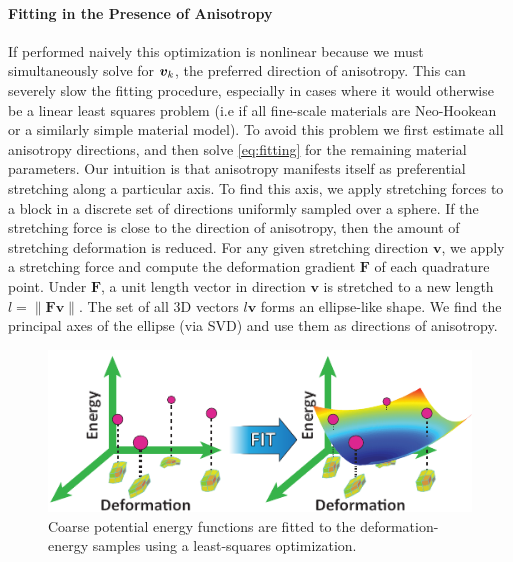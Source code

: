 \paragraph{Fitting in the Presence of Anisotropy}
If performed naively this optimization is nonlinear because we must simultaneously solve for $\bm{v}_k$, the preferred direction of anisotropy. This can severely slow the fitting procedure, especially in cases where it would otherwise be a linear least squares problem (i.e if all fine-scale materials are Neo-Hookean or a similarly simple material model).
To avoid this problem we first estimate all anisotropy directions, and then solve \autoref{eq:fitting} for the remaining material parameters.
Our intuition is that anisotropy manifests itself as preferential stretching along a particular axis. To find this axis, we apply stretching forces to a block in a discrete set of directions uniformly sampled over a sphere.
If the stretching force is close to the direction of anisotropy, then the amount of stretching deformation is reduced.
For any given stretching direction $\mathbf{v}$, we apply a stretching force and compute the deformation gradient $\mathbf{F}$ of  each quadrature point.
Under $\mathbf{F}$, a unit length vector in direction $\mathbf{v}$ is stretched to a new length $l = \|\mathbf{F}\mathbf{v}\|$.
The set of all 3D vectors $l\mathbf{v}$ forms an ellipse-like shape.
We find the principal axes of the ellipse (via SVD) and use them as directions of anisotropy.
\begin{figure}
	\centering
	\includegraphics[width=0.6\columnwidth]{images/fitting.pdf}
	\caption{ Coarse potential energy functions are fitted to the deformation-energy samples using a least-squares optimization.}
	\label{fig:fitting}
\end{figure}
